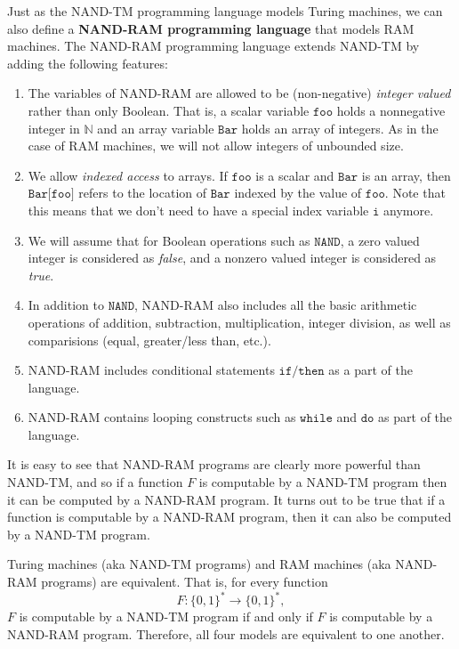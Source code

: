 \documentclass{article}
\begin{document}
  Just as the NAND-TM programming language models Turing machines, we can also define a \textbf{NAND-RAM programming language} that models RAM machines. The NAND-RAM programming language extends NAND-TM by adding the following features: 
  \begin{enumerate}
      \item The variables of NAND-RAM are allowed to be (non-negative) \textit{integer valued} rather than only Boolean. That is, a scalar variable $\texttt{foo}$ holds a nonnegative integer in $\mathbb{N}$ and an array variable $\texttt{Bar}$ holds an array of integers. As in the case of RAM machines, we will not allow integers of unbounded size. 
      \item We allow \textit{indexed access} to arrays. If $\texttt{foo}$ is a scalar and $\texttt{Bar}$ is an array, then $\texttt{Bar[foo]}$ refers to the location of $\texttt{Bar}$ indexed by the value of $\texttt{foo}$. Note that this means that we don't need to have a special index variable $\texttt{i}$ anymore. 
      \item We will assume that for Boolean operations such as $\texttt{NAND}$, a zero valued integer is considered as \textit{false}, and a nonzero valued integer is considered as \textit{true}. 
      \item In addition to $\texttt{NAND}$, NAND-RAM also includes all the basic arithmetic operations of addition, subtraction, multiplication, integer division, as well as comparisions (equal, greater/less than, etc.). 
      \item NAND-RAM includes conditional statements $\texttt{if/then}$ as a part of the language. 
      \item NAND-RAM contains looping constructs such as $\texttt{while}$ and $\texttt{do}$ as part of the language. 
  \end{enumerate}

  It is easy to see that NAND-RAM programs are clearly more powerful than NAND-TM, and so if a function $F$ is computable by a NAND-TM program then it can be computed by a NAND-RAM program. It turns out to be true that if a function is computable by a NAND-RAM program, then it can also be computed by a NAND-TM program. 

  \begin{theorem}
  Turing machines (aka NAND-TM programs) and RAM machines (aka NAND-RAM programs) are equivalent. That is, for every function 
  \[F: \{0,1\}^* \longrightarrow \{0,1\}^* ,\]
  $F$ is computable by a NAND-TM program if and only if $F$ is computable by a NAND-RAM program. Therefore, all four models are equivalent to one another. 
  \end{theorem}
\end{document}
